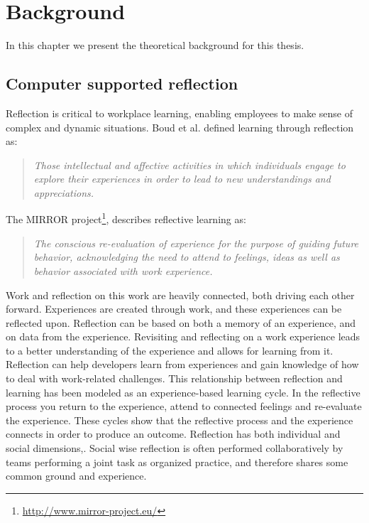 \chapter{Background}
\label{chap:background}
In this chapter we present the theoretical background for this thesis. 

\section{Computer supported reflection}
Reflection is critical to workplace learning, enabling employees to make sense of complex and dynamic situations\citep{Schon1983}. Boud et al.\citep{boudreflection1985} defined learning through reflection as: 
\begin{quote}
\emph{Those intellectual and affective activities in which individuals engage to explore their experiences in order to lead to new understandings and appreciations.}
\end{quote}
The MIRROR project\footnote{\url{http://www.mirror-project.eu/}}, describes reflective learning as:
\begin{quote}
\emph{The conscious re-evaluation of experience for the purpose of guiding future behavior, acknowledging the need to attend to feelings, ideas as well as behavior associated with work experience.}\citep{krogstiemodel}
\end{quote}

Work and reflection on this work are heavily connected\citep{Schon1983}, both driving each other forward. Experiences are created through work, and these experiences can be reflected upon. Reflection can be based on both a memory of an experience, and on data from the experience. Revisiting and reflecting on a work experience leads to a better understanding of the experience and allows for learning from it. Reflection can help developers learn from experiences and gain knowledge of how to deal with work-related challenges. This relationship between reflection and learning has been modeled as an experience-based learning cycle\citep{boudreflection1985,Korthagen_Vasalos_2005, KolbModel}. In the reflective process you return to the experience, attend to connected feelings and re-evaluate
the experience. These cycles show that the reflective process and the experience connects in order to produce an outcome.
Reflection has both individual and social dimensions,\citep{Hoeyrup_2004,Woerkom_Croon_2008}. Social wise reflection is often performed collaboratively by teams performing a joint task as organized practice, and therefore shares some common ground and experience. 


